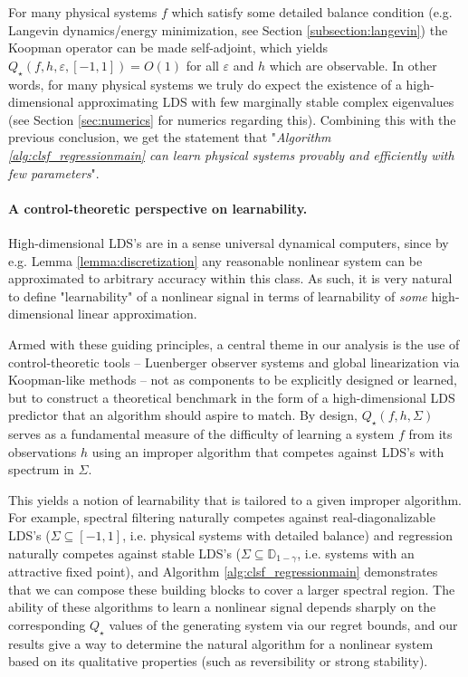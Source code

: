 \documentclass[11pt]{article}
\renewcommand{\subset}{\subseteq}
\newcommand{\evannote}[1]{\textcolor{red}{\{evan: #1\}}}
\def\epsilon{\varepsilon}
\numberwithin{equation}{section}
\begin{document}
    For many physical systems $f$ which satisfy some detailed balance condition (e.g. Langevin dynamics/energy minimization, see Section \ref{subsection:langevin}) the Koopman operator can be made self-adjoint, which yields $Q_\star(f, h, \epsilon, [-1, 1]) = O(1)$ for all $\epsilon$ and $h$ which are observable. 
    In other words, for many physical systems we truly do expect the existence of a high-dimensional approximating LDS with few marginally stable complex eigenvalues (see Section \ref{sec:numerics} for numerics regarding this). Combining this with the previous conclusion, we get the statement that "\textit{Algorithm \ref{alg:clsf_regressionmain} can learn physical systems provably and efficiently with few parameters}".

\paragraph{A control-theoretic perspective on learnability.} 
High-dimensional LDS's are in a sense universal dynamical computers, since by e.g. Lemma \ref{lemma:discretization} any reasonable nonlinear system can be approximated to arbitrary accuracy within this class. As such, it is very natural to define "learnability" of a nonlinear signal in terms of learnability of \textit{some} high-dimensional linear approximation. 

Armed with these guiding principles, a central theme in our analysis is the use of control-theoretic tools -- Luenberger observer systems and global linearization via Koopman-like methods -- not as components to be explicitly designed or learned, but to construct a theoretical benchmark in the form of a high-dimensional LDS predictor that an algorithm should aspire to match.
By design, $Q_\star(f, h, \Sigma)$ serves as a fundamental measure of the difficulty of learning a system $f$ from its observations $h$ using an improper algorithm that competes against LDS's with spectrum in $\Sigma$. 

This yields a notion of learnability that is tailored to a given improper algorithm.
For example, spectral filtering naturally competes against real-diagonalizable LDS's ($\Sigma \subset [-1, 1]$, i.e. physical systems with detailed balance) and regression naturally competes against stable LDS's ($\Sigma \subset \mathbb{D}_{1-\gamma}$, i.e. systems with an attractive fixed point), and Algorithm \ref{alg:clsf_regressionmain} demonstrates that we can compose these building blocks to cover a larger spectral region. The ability of these algorithms to learn a nonlinear signal depends sharply on the corresponding $Q_\star$ values of the generating system via our regret bounds, and our results give a way to determine the natural algorithm for a nonlinear system based on its qualitative properties (such as reversibility or strong stability). 
\end{document}
